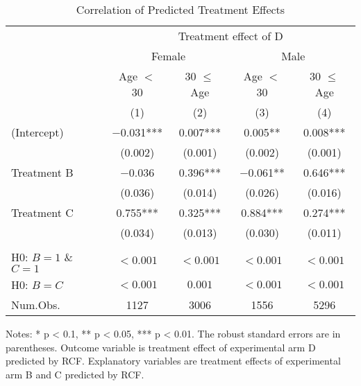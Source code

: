 \documentclass[
  11pt,
  a4paper
]{article}
\begin{document}
\begin{table}

\caption{\label{tab:rcf-int-corr}Correlation of Predicted Treatment Effects}
\centering
\fontsize{9}{11}\selectfont
\begin{threeparttable}
\begin{tabular}[t]{lcccc}
\toprule
\multicolumn{1}{c}{ } & \multicolumn{4}{c}{Treatment effect of D} \\
\cmidrule(l{3pt}r{3pt}){2-5}
\multicolumn{1}{c}{ } & \multicolumn{2}{c}{Female} & \multicolumn{2}{c}{Male} \\
\cmidrule(l{3pt}r{3pt}){2-3} \cmidrule(l{3pt}r{3pt}){4-5}
\multicolumn{1}{c}{ } & \multicolumn{1}{c}{Age $<$ 30} & \multicolumn{1}{c}{30 $\le$ Age} & \multicolumn{1}{c}{Age $<$ 30} & \multicolumn{1}{c}{30 $\le$ Age} \\
\cmidrule(l{3pt}r{3pt}){2-2} \cmidrule(l{3pt}r{3pt}){3-3} \cmidrule(l{3pt}r{3pt}){4-4} \cmidrule(l{3pt}r{3pt}){5-5}
  & (1) & (2) & (3) & (4)\\
\midrule
(Intercept) & \num{-0.031}*** & \num{0.007}*** & \num{0.005}** & \num{0.008}***\\
 & (\num{0.002}) & (\num{0.001}) & (\num{0.002}) & (\num{0.001})\\
Treatment B & \num{-0.036} & \num{0.396}*** & \num{-0.061}** & \num{0.646}***\\
 & (\num{0.036}) & (\num{0.014}) & (\num{0.026}) & (\num{0.016})\\
Treatment C & \num{0.755}*** & \num{0.325}*** & \num{0.884}*** & \num{0.274}***\\
 & (\num{0.034}) & (\num{0.013}) & (\num{0.030}) & (\num{0.011})\\
\midrule
\addlinespace[0.3em]
\multicolumn{5}{l}{\textit{F-test, p-value}}\\
\hspace{1em}H0: $B = 1$ \& $C = 1$ & $< 0.001$ & $< 0.001$ & $< 0.001$ & $< 0.001$\\
\hspace{1em}H0: $B = C$ & $< 0.001$ & $0.001$ & $< 0.001$ & $< 0.001$\\
Num.Obs. & \num{1127} & \num{3006} & \num{1556} & \num{5296}\\
\bottomrule
\end{tabular}
\begin{tablenotes}
\item Notes: * p < 0.1, ** p < 0.05, *** p < 0.01. The robust standard errors are in parentheses. Outcome variable is treatment effect of experimental arm D predicted by RCF. Explanatory variables are treatment effects of experimental arm B and C predicted by RCF.
\end{tablenotes}
\end{threeparttable}
\end{table}
\end{document}
